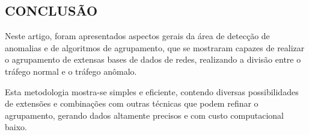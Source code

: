 \documentclass[article,12pt,oneside,a4paper,english,brazil]{unifil}
\begin{document}
\begin{Spacing}{1.5}
\section*{CONCLUSÃO}
Neste artigo, foram apresentados aspectos gerais da área de detecção de anomalias e de algoritmos de agrupamento, que se mostraram capazes de realizar o agrupamento de extensas bases de dados de redes, realizando a divisão entre o tráfego normal e o tráfego anômalo.

Esta metodologia mostra-se simples e eficiente, contendo diversas possibilidades de extensões e combinações com outras técnicas que podem refinar o agrupamento, gerando dados altamente precisos e com custo computacional baixo.

\end{Spacing}
\postextual

{}
\end{document}
